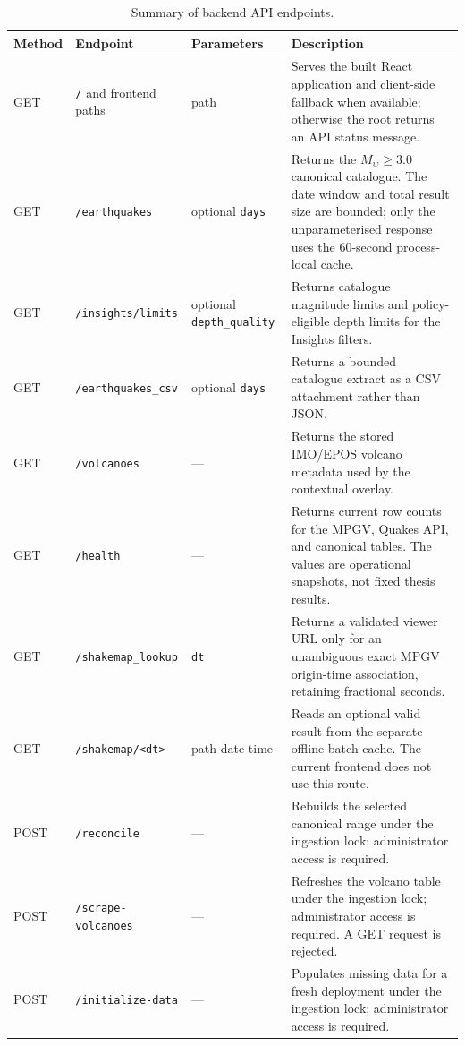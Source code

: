 \documentclass[12pt]{article}
\begin{document}
\begin{table}[H]
\centering
\caption{Summary of backend API endpoints.}
\label{tab:api-endpoints}
\footnotesize
\setlength{\tabcolsep}{2pt}
\renewcommand{\arraystretch}{1.08}
\begin{tabular}{>{\raggedright\arraybackslash}p{1.4cm}>{\raggedright\arraybackslash}p{3.5cm}>{\raggedright\arraybackslash}p{2.8cm}>{\raggedright\arraybackslash}p{6.3cm}}
\toprule
\textbf{Method} & \textbf{Endpoint} & \textbf{Parameters} & \textbf{Description} \\
\midrule
GET & \texttt{/} and frontend paths & path & Serves the built React application and client-side fallback when available; otherwise the root returns an API status message. \\
GET & \texttt{/earthquakes} & optional \texttt{days} & Returns the $M_w \geq 3.0$ canonical catalogue. The date window and total result size are bounded; only the unparameterised response uses the 60-second process-local cache. \\
GET & \texttt{/insights/limits} & optional \texttt{depth\_quality} & Returns catalogue magnitude limits and policy-eligible depth limits for the Insights filters. \\
GET & \texttt{/earthquakes\_csv} & optional \texttt{days} & Returns a bounded catalogue extract as a CSV attachment rather than JSON. \\
GET & \texttt{/volcanoes} & --- & Returns the stored IMO/EPOS volcano metadata used by the contextual overlay. \\
GET & \texttt{/health} & --- & Returns current row counts for the MPGV, Quakes API, and canonical tables. The values are operational snapshots, not fixed thesis results. \\
GET & \texttt{/shakemap\_lookup} & \texttt{dt} & Returns a validated viewer URL only for an unambiguous exact MPGV origin-time association, retaining fractional seconds. \\
GET & \texttt{/shakemap/<dt>} & path date-time & Reads an optional valid result from the separate offline batch cache. The current frontend does not use this route. \\
POST & \texttt{/reconcile} & --- & Rebuilds the selected canonical range under the ingestion lock; administrator access is required. \\
POST & \texttt{/scrape-volcanoes} & --- & Refreshes the volcano table under the ingestion lock; administrator access is required. A GET request is rejected. \\
POST & \texttt{/initialize-data} & --- & Populates missing data for a fresh deployment under the ingestion lock; administrator access is required. \\
\bottomrule
\end{tabular}
\end{table}
\end{document}
